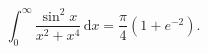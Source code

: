 %

\begin{problem}[pytanie 803954]
    \label{stack_803954}%
    \begin{equation}
        \int_0^\infty \frac{\sin^2 x}{x^2 + x^4} \,\mathrm{d}x = \frac \pi 4 \left(1 + e^{-2}\right).
    \end{equation}
\end{problem}

%